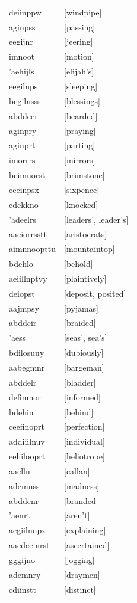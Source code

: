 \documentclass{article}
\begin{document}
\begin{tabular}{ll}
deiinppw & [windpipe] \\
aginpss & [passing] \\
eegijnr & [jeering] \\
imnoot & [motion] \\
'aehijls & [elijah's] \\
eegilnps & [sleeping] \\
begilnsss & [blessings] \\
abddeer & [bearded] \\
aginpry & [praying] \\
aginprt & [parting] \\
imorrrs & [mirrors] \\
beimnorst & [brimstone] \\
ceeinpsx & [sixpence] \\
cdekkno & [knocked] \\
'adeelrs & [leaders', leader's] \\
aaciorrsstt & [aristocrats] \\
aimnnoopttu & [mountaintop] \\
bdehlo & [behold] \\
aeiillnptvy & [plaintively] \\
deiopst & [deposit, posited] \\
aajmpsy & [pyjamas] \\
abddeir & [braided] \\
'aess & [seas', sea's] \\
bdilosuuy & [dubiously] \\
aabegmnr & [bargeman] \\
abddelr & [bladder] \\
defimnor & [informed] \\
bdehin & [behind] \\
ceefinoprt & [perfection] \\
addiiilnuv & [individual] \\
eehilooprt & [heliotrope] \\
aaclln & [callan] \\
ademnss & [madness] \\
abddenr & [branded] \\
'aenrt & [aren't] \\
aegiilnnpx & [explaining] \\
aacdeeinrst & [ascertained] \\
gggijno & [jogging] \\
ademnry & [draymen] \\
cdiinstt & [distinct] \\

\end{tabular}
\end{document}
